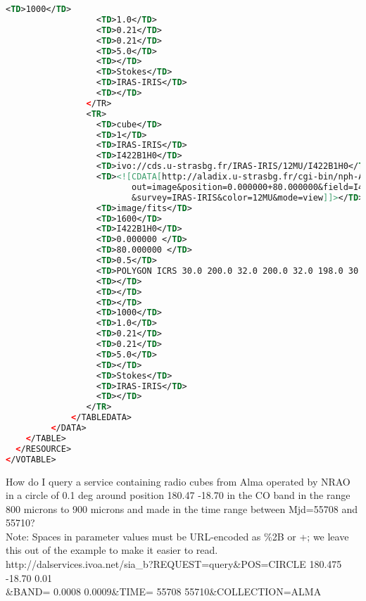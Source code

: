\documentclass[11pt,a4paper]{ivoa}
\begin{document}
\begin{lstlisting}[basicstyle=\scriptsize,language=XML]
                  <TD>1000</TD>
                  <TD>1.0</TD>
                  <TD>0.21</TD>
                  <TD>0.21</TD>
                  <TD>5.0</TD>
                  <TD></TD>
                  <TD>Stokes</TD>
                  <TD>IRAS-IRIS</TD>
                  <TD></TD>
                </TR>
                <TR>
                  <TD>cube</TD>
                  <TD>1</TD>
                  <TD>IRAS-IRIS</TD>
                  <TD>I422B1H0</TD>
                  <TD>ivo://cds.u-strasbg.fr/IRAS-IRIS/12MU/I422B1H0</TD>
                  <TD><![CDATA[http://aladix.u-strasbg.fr/cgi-bin/nph-Aladin++dev.cgi?
                         out=image&position=0.000000+80.000000&field=I422B1H0
                         &survey=IRAS-IRIS&color=12MU&mode=view]]></TD>
                  <TD>image/fits</TD>
                  <TD>1600</TD>
                  <TD>I422B1H0</TD>
                  <TD>0.000000 </TD>
                  <TD>80.000000 </TD>
                  <TD>0.5</TD>
                  <TD>POLYGON ICRS 30.0 200.0 32.0 200.0 32.0 198.0 30.0 198.0</TD>
                  <TD></TD>
                  <TD></TD>
                  <TD></TD>
                  <TD>1000</TD>
                  <TD>1.0</TD>
                  <TD>0.21</TD>
                  <TD>0.21</TD>
                  <TD>5.0</TD>
                  <TD></TD>
                  <TD>Stokes</TD>
                  <TD>IRAS-IRIS</TD>
                  <TD></TD>
                </TR>
             </TABLEDATA>
         </DATA>
    </TABLE>
  </RESOURCE>
</VOTABLE>
\end{lstlisting}
         How do I query a service containing radio cubes from Alma operated by NRAO in a circle of 0.1 deg around position 180.47 -18.70 in the CO band in the range 800 microns to 900 microns and made in the time range between Mjd=55708 and 55710? \\
Note: Spaces in parameter values must be URL-encoded as \%2B or +; we leave this out of the example to make it easier to read.\\
{\footnotesize http://dalservices.ivoa.net/sia\_b?REQUEST=query\&POS=CIRCLE 180.475 -18.70 0.01 \\ \&BAND= 0.0008 0.0009\&TIME= 55708 55710\&COLLECTION=ALMA}
\end{document}
